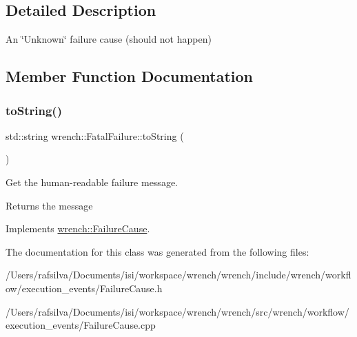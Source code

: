 \subsection{Detailed Description}
An \char`\"{}\+Unknown\char`\"{} failure cause (should not happen) 

\subsection{Member Function Documentation}
\mbox{\label{classwrench_1_1_fatal_failure_a4b547da3bac56b7b23aeba34c2dbbd39}} 
\subsubsection{\texorpdfstring{to\+String()}{toString()}}
{\footnotesize\ttfamily std\+::string wrench\+::\+Fatal\+Failure\+::to\+String (\begin{DoxyParamCaption}{ }\end{DoxyParamCaption})\hspace{0.3cm}{\ttfamily [virtual]}}



Get the human-\/readable failure message. 

\begin{DoxyReturn}{Returns}
the message 
\end{DoxyReturn}


Implements \hyperlink{classwrench_1_1_failure_cause_afbad248ebe902409f2cd4f1d6f2b867d}{wrench\+::\+Failure\+Cause}.



The documentation for this class was generated from the following files\+:\begin{DoxyCompactItemize}
\item 
/\+Users/rafsilva/\+Documents/isi/workspace/wrench/wrench/include/wrench/workflow/execution\+\_\+events/Failure\+Cause.\+h\item 
/\+Users/rafsilva/\+Documents/isi/workspace/wrench/wrench/src/wrench/workflow/execution\+\_\+events/Failure\+Cause.\+cpp\end{DoxyCompactItemize}
